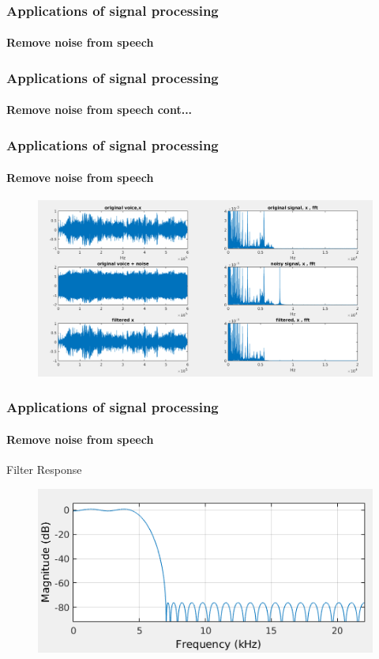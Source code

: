 \documentclass[hyperref={pdfpagelabels=true}]{beamer}
\begin{document}
\begin{frame}
\frametitle{Applications of signal processing}
\framesubtitle{Remove noise from speech }
\scriptsize{
\begin{tcolorbox}[title=  ,width=9.85 cm]

\end{tcolorbox} }

\end{frame}

\begin{frame}
\frametitle{Applications of signal processing}
\framesubtitle{Remove noise from speech {\tiny cont...} }
\tiny{ 
\begin{tcolorbox}[title=  ,width=9.85 cm]

\end{tcolorbox} }
\end{frame}


\begin{frame}
\frametitle{Applications of signal processing}
\framesubtitle{Remove noise from speech}
\begin{figure}[!tbp]
\centering
\includegraphics[scale = 0.24]{figs/fil1.png}
\end{figure}
\end{frame}

\begin{frame}
\frametitle{Applications of signal processing}
\framesubtitle{Remove noise from speech}
Filter Response
\begin{figure}[!tbp]
\centering
\includegraphics[scale = 0.45]{figs/fil2.png}
\end{figure}
\end{frame}
\end{document}
